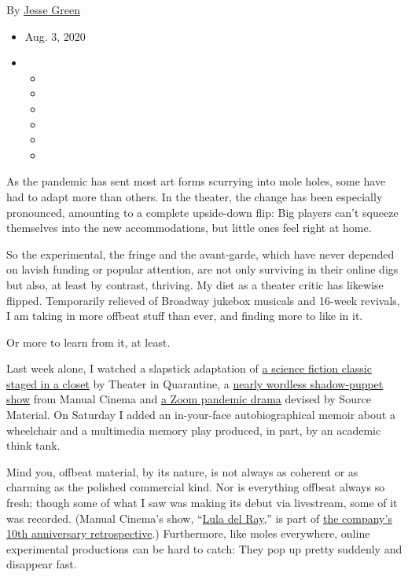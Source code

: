 By \href{https://www.nytimes3xbfgragh.onion/by/jesse-green}{Jesse Green}

\begin{itemize}
\item
  Aug. 3, 2020
\item
  \begin{itemize}
  \item
  \item
  \item
  \item
  \item
  \item
  \end{itemize}
\end{itemize}

As the pandemic has sent most art forms scurrying into mole holes, some
have had to adapt more than others. In the theater, the change has been
especially pronounced, amounting to a complete upside-down flip: Big
players can't squeeze themselves into the new accommodations, but little
ones feel right at home.

So the experimental, the fringe and the avant-garde, which have never
depended on lavish funding or popular attention, are not only surviving
in their online digs but also, at least by contrast, thriving. My diet
as a theater critic has likewise flipped. Temporarily relieved of
Broadway jukebox musicals and 16-week revivals, I am taking in more
offbeat stuff than ever, and finding more to like in it.

Or more to learn from it, at least.

Last week alone, I watched a slapstick adaptation of
\href{https://www.nytimes3xbfgragh.onion/2020/07/31/theater/the-7th-voyage-of-egon-tichy-review.html}{a
science fiction classic staged in a closet} by Theater in Quarantine, a
\href{http://manualcinema.com/watch/}{nearly wordless shadow-puppet
show} from Manual Cinema and
\href{https://www.nytimes3xbfgragh.onion/2020/07/26/theater/in-these-uncertain-times-review.html}{a
Zoom pandemic drama} devised by Source Material. On Saturday I added an
in-your-face autobiographical memoir about a wheelchair and a multimedia
memory play produced, in part, by an academic think tank.

Mind you, offbeat material, by its nature, is not always as coherent or
as charming as the polished commercial kind. Nor is everything offbeat
always so fresh; though some of what I saw was making its debut via
livestream, some of it was recorded. (Manual Cinema's show,
``\href{https://www.nytimes3xbfgragh.onion/2017/01/06/theater/lula-del-ray-a-spectral-parade-of-fantastical-images.html}{Lula
del Ray},'' is part of
\href{https://www.nytimes3xbfgragh.onion/2020/07/23/theater/manual-cinema-puppets-retrospective.html}{the
company's 10th anniversary retrospective}.) Furthermore, like moles
everywhere, online experimental productions can be hard to catch: They
pop up pretty suddenly and disappear fast.

